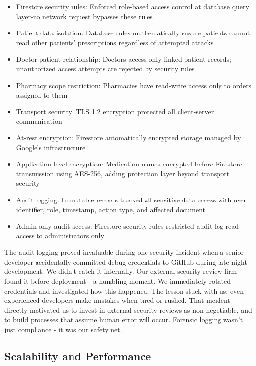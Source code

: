 \documentclass[12pt,a4paper]{report}
\begin{document}
\begin{itemize}
  \item Firestore security rules: Enforced role-based access control at database query layer-no network request bypasses these rules
  \item Patient data isolation: Database rules mathematically ensure patients cannot read other patients' prescriptions regardless of attempted attacks
  \item Doctor-patient relationship: Doctors access only linked patient records; unauthorized access attempts are rejected by security rules
  \item Pharmacy scope restriction: Pharmacies have read-write access only to orders assigned to them
  \item Transport security: TLS 1.2 encryption protected all client-server communication
  \item At-rest encryption: Firestore automatically encrypted storage managed by Google's infrastructure
  \item Application-level encryption: Medication names encrypted before Firestore transmission using AES-256, adding protection layer beyond transport security
  \item Audit logging: Immutable records tracked all sensitive data access with user identifier, role, timestamp, action type, and affected document
  \item Admin-only audit access: Firestore security rules restricted audit log read access to administrators only
\end{itemize}

The audit logging proved invaluable during one security incident when a senior developer accidentally committed debug credentials to GitHub during late-night development. We didn't catch it internally. Our external security review firm found it before deployment - a humbling moment. We immediately rotated credentials and investigated how this happened. The lesson stuck with us: even experienced developers make mistakes when tired or rushed. That incident directly motivated us to invest in external security reviews as non-negotiable, and to build processes that assume human error will occur. Forensic logging wasn't just compliance - it was our safety net.

\subsection{Scalability and Performance}
\end{document}
